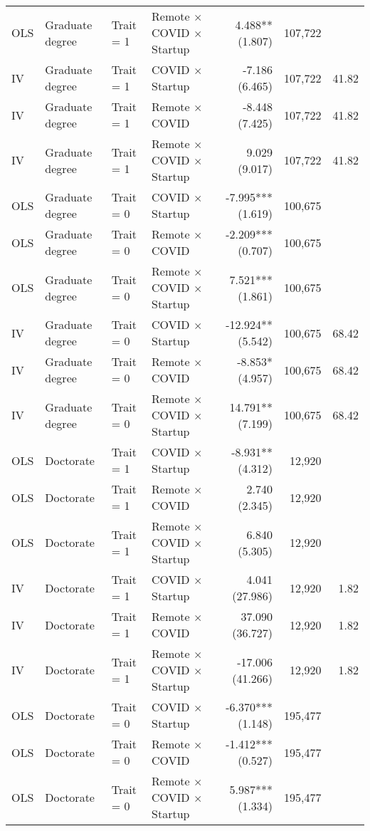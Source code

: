 \documentclass[11pt]{article}
\begin{document}
{\begin{longtable}{llllrrr}
OLS & Graduate degree & Trait = 1 & Remote $\times$ COVID $\times$ Startup &  4.488** (1.807) & 107,722 &  \\
IV & Graduate degree & Trait = 1 & COVID $\times$ Startup & -7.186 (6.465) & 107,722 & 41.82 \\
IV & Graduate degree & Trait = 1 & Remote $\times$ COVID & -8.448 (7.425) & 107,722 & 41.82 \\
IV & Graduate degree & Trait = 1 & Remote $\times$ COVID $\times$ Startup &  9.029 (9.017) & 107,722 & 41.82 \\
OLS & Graduate degree & Trait = 0 & COVID $\times$ Startup & -7.995*** (1.619) & 100,675 &  \\
OLS & Graduate degree & Trait = 0 & Remote $\times$ COVID & -2.209*** (0.707) & 100,675 &  \\
OLS & Graduate degree & Trait = 0 & Remote $\times$ COVID $\times$ Startup &  7.521*** (1.861) & 100,675 &  \\
IV & Graduate degree & Trait = 0 & COVID $\times$ Startup & -12.924** (5.542) & 100,675 & 68.42 \\
IV & Graduate degree & Trait = 0 & Remote $\times$ COVID & -8.853* (4.957) & 100,675 & 68.42 \\
IV & Graduate degree & Trait = 0 & Remote $\times$ COVID $\times$ Startup &  14.791** (7.199) & 100,675 & 68.42 \\
OLS & Doctorate & Trait = 1 & COVID $\times$ Startup & -8.931** (4.312) & 12,920 &  \\
OLS & Doctorate & Trait = 1 & Remote $\times$ COVID &  2.740 (2.345) & 12,920 &  \\
OLS & Doctorate & Trait = 1 & Remote $\times$ COVID $\times$ Startup &  6.840 (5.305) & 12,920 &  \\
IV & Doctorate & Trait = 1 & COVID $\times$ Startup &  4.041 (27.986) & 12,920 & 1.82 \\
IV & Doctorate & Trait = 1 & Remote $\times$ COVID &  37.090 (36.727) & 12,920 & 1.82 \\
IV & Doctorate & Trait = 1 & Remote $\times$ COVID $\times$ Startup & -17.006 (41.266) & 12,920 & 1.82 \\
OLS & Doctorate & Trait = 0 & COVID $\times$ Startup & -6.370*** (1.148) & 195,477 &  \\
OLS & Doctorate & Trait = 0 & Remote $\times$ COVID & -1.412*** (0.527) & 195,477 &  \\
OLS & Doctorate & Trait = 0 & Remote $\times$ COVID $\times$ Startup &  5.987*** (1.334) & 195,477 &  \\

\end{longtable}}
\end{document}
